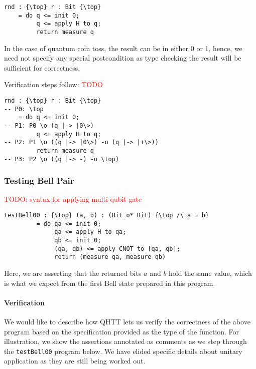\documentclass[acmsmall,nonacm,timestamp,review=false,anonymous=false]{acmart}
\newcommand{\todo}[1]{\textcolor{red}{#1}}
\begin{document}
\begin{minipage}{0.95\linewidth}
\begin{lstlisting}[language=QHaskell]
rnd : {\top} r : Bit {\top}
    = do q <= init 0;
         q <= apply H to q;
         return measure q
\end{lstlisting}
\end{minipage}

In the case of quantum coin toss, the result can be in either 0 or 1, hence, we need not specify any special postcondition as type checking the result will be sufficient for correctness.

Verification steps follow: \todo{TODO}

\begin{minipage}{0.95\linewidth}
\begin{lstlisting}[language=QHaskell]
rnd : {\top} r : Bit {\top}
-- P0: \top
    = do q <= init 0;
-- P1: P0 \o (q |-> |0\>)
         q <= apply H to q;
-- P2: P1 \o ((q |-> |0\>) -o (q |-> |+\>))
         return measure q
-- P3: P2 \o ((q |-> -) -o \top)
\end{lstlisting}
\end{minipage}

\subsubsection{Testing Bell Pair}
\leavevmode
\todo{TODO: syntax for applying multi-qubit gate}

\begin{minipage}{0.95\linewidth}
\begin{lstlisting}[language=QHaskell]
testBell00 : {\top} (a, b) : (Bit o* Bit) {\top /\ a = b}
         = do qa <= init 0;
              qa <= apply H to qa;
              qb <= init 0;
              (qa, qb) <= apply CNOT to [qa, qb];
              return (measure qa, measure qb)
\end{lstlisting}
\end{minipage}

Here, we are asserting that the returned bits $a$ and $b$ hold the same value, which is what we expect from the first Bell state prepared in this program.

\paragraph{Verification}
We would like to describe how QHTT lets us verify the correctness of the above program based on the specification provided as the type of the function. For illustration, we show the assertions annotated as comments as we step through the \texttt{testBell00} program below. We have elided specific details about unitary application as they are still being worked out.
\end{document}
